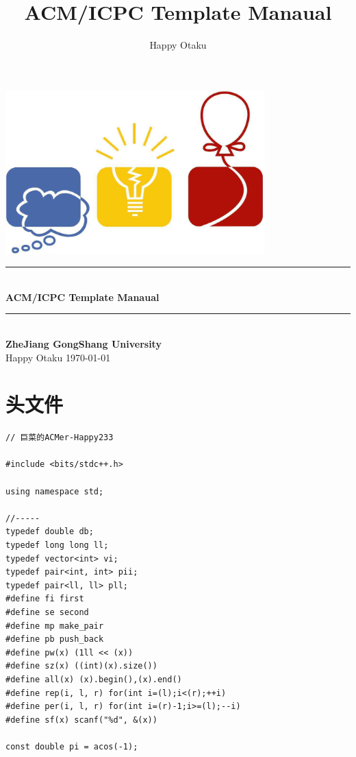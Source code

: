 \documentclass[twoside]{article}
\title{ACM/ICPC Template Manaual}
\author{Happy Otaku}
\newcommand{\HRule}{\rule{\linewidth}{0.5mm}}
\begin{document}
\small
\begin{titlepage}
\begin{center}
\vspace*{0.5cm}\includegraphics[width=0.75\textwidth]{logo.jpg} \\ [2cm]
\HRule \\ [1cm]
\textbf{\Huge{ACM/ICPC Template Manaual}} \\ [0.5cm]
\HRule \\ [4cm]
\textbf{\Huge{ZheJiang GongShang University}} \\ [1cm]
\LARGE{Happy Otaku}
\vfill
\Large{\today}
\end{center}
\clearpage
\end{titlepage}
\tableofcontents\clearpage
\pagestyle{fancy}
\lfoot{}
\cfoot{\thepage}\rfoot{}
\setcounter{section}{-1}
\setcounter{page}{1}
\clearpage\section{头文件}
\begin{lstlisting}
// 巨菜的ACMer-Happy233

#include <bits/stdc++.h>

using namespace std;

//-----
typedef double db;
typedef long long ll;
typedef vector<int> vi;
typedef pair<int, int> pii;
typedef pair<ll, ll> pll;
#define fi first
#define se second
#define mp make_pair
#define pb push_back
#define pw(x) (1ll << (x))
#define sz(x) ((int)(x).size())
#define all(x) (x).begin(),(x).end()
#define rep(i, l, r) for(int i=(l);i<(r);++i)
#define per(i, l, r) for(int i=(r)-1;i>=(l);--i)
#define sf(x) scanf("%d", &(x))

const double pi = acos(-1);\end{lstlisting}
\end{document}
